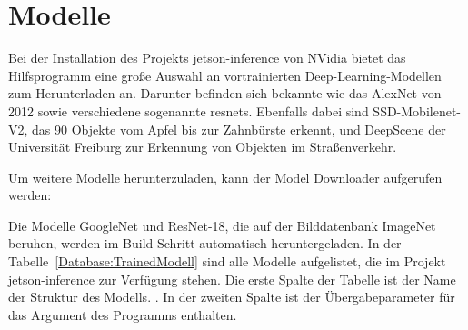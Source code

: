 %
%



\section{Modelle}

Bei der Installation des Projekts jetson-inference von NVidia bietet das Hilfsprogramm eine große Auswahl an vortrainierten Deep-Learning-Modellen zum Herunterladen an. Darunter befinden sich bekannte wie das AlexNet von 2012 sowie verschiedene sogenannte \ac{resnets}. Ebenfalls dabei sind SSD-Mobilenet-V2, das 90 Objekte vom Apfel bis zur  Zahnbürste erkennt, und DeepScene der Universität Freiburg zur Erkennung von Objekten im Straßenverkehr. 

Um weitere Modelle herunterzuladen, kann der Model Downloader aufgerufen werden:

\medskip

 \newline 
{} 

\medskip

Die Modelle GoogleNet und ResNet-18, die auf der Bilddatenbank ImageNet beruhen, werden im Build-Schritt automatisch heruntergeladen. In der Tabelle~\ref{Database:TrainedModell} sind alle Modelle aufgelistet, die im Projekt jetson-inference zur Verfügung stehen. Die erste Spalte der Tabelle ist der Name der Struktur des Modells. \cite{Alom:2018}. In der zweiten Spalte ist der Übergabeparameter für das Argument  des Programms  enthalten.

\medskip

